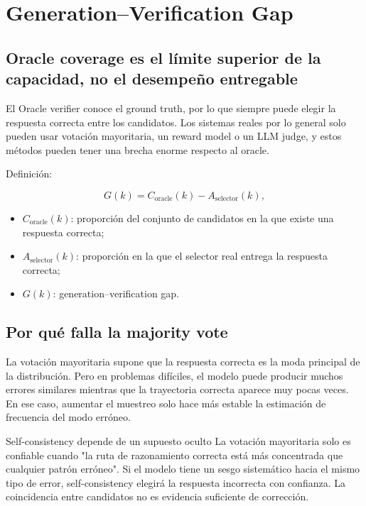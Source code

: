 \section{Generation--Verification Gap}

\subsection{Oracle coverage es el límite superior de la capacidad, no el desempeño entregable}

El Oracle verifier conoce el ground truth, por lo que siempre puede elegir la respuesta correcta entre los candidatos. Los sistemas reales por lo general solo pueden usar votación mayoritaria, un reward model o un LLM judge, y estos métodos pueden tener una brecha enorme respecto al oracle.


Definición:

$$
G(k)=C_{\mathrm{oracle}}(k)-A_{\mathrm{selector}}(k),
$$

\begin{itemize}
    \item $C_{\mathrm{oracle}}(k)$: proporción del conjunto de candidatos en la que existe una respuesta correcta;
    \item $A_{\mathrm{selector}}(k)$: proporción en la que el selector real entrega la respuesta correcta;
    \item $G(k)$: generation--verification gap.
\end{itemize}

\subsection{Por qué falla la majority vote}

La votación mayoritaria supone que la respuesta correcta es la moda principal de la distribución. Pero en problemas difíciles, el modelo puede producir muchos errores similares mientras que la trayectoria correcta aparece muy pocas veces. En ese caso, aumentar el muestreo solo hace más estable la estimación de frecuencia del modo erróneo.


\begin{warningbox}{Self-consistency depende de un supuesto oculto}
La votación mayoritaria solo es confiable cuando "la ruta de razonamiento correcta está más concentrada que cualquier patrón erróneo". Si el modelo tiene un sesgo sistemático hacia el mismo tipo de error, self-consistency elegirá la respuesta incorrecta con confianza. La coincidencia entre candidatos no es evidencia suficiente de corrección.
\end{warningbox}

